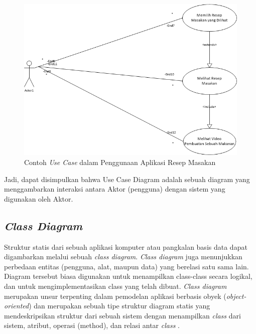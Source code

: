 \begin{enumerate}
\begin{figure}[H]
				\centering
				\includegraphics[width=1\textwidth]{gambar/use-case/contoh-use-case}
				\caption{Contoh \textit{Use Case} dalam Penggunaan Aplikasi Resep Masakan}
				\label{use-case-example}
			\end{figure}
			Jadi, dapat disimpulkan bahwa Use Case Diagram adalah sebuah diagram yang menggambarkan interaksi antara Aktor (pengguna) dengan sistem yang digunakan oleh Aktor.
			  

		\end{enumerate}
		
		
	\subsection{\emph{Class Diagram}}
		Struktur statis dari sebuah aplikasi komputer atau pangkalan basis data dapat digambarkan melalui sebuah \emph{class diagram}. \emph{Class diagram} juga menunjukkan perbedaan entitas (pengguna, alat, maupun data) yang berelasi satu sama lain. Diagram tersebut biasa digunakan untuk menampilkan class-class secara logikal, dan untuk mengimplementasikan class yang telah dibuat. \emph{Class diagram} merupakan unsur terpenting dalam pemodelan aplikasi berbasis obyek (\emph{object-oriented}) dan merupakan sebuah tipe struktur diagram statis yang mendeskripsikan struktur dari sebuah sistem dengan menampilkan \emph{class} dari sistem, atribut, operasi (method), dan relasi antar \emph{class} \cite{lee}.  
		
